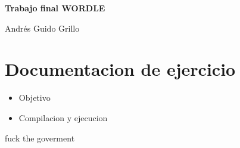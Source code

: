 \documentclass[oneside]{article}
\begin{document}
	\thispagestyle{fancy}
	\begin{titlepage}
		\vspace*{\fill}		
		\centering
		{\huge \bfseries Trabajo final WORDLE\par}
		\vspace{1cm}
		{\large Andrés Guido Grillo\par}		
		\vfill
	\end{titlepage}
	
	\section*{Documentacion de ejercicio}
	\begin{itemize}
		\item Objetivo
		\item Compilacion y ejecucion
	\end{itemize}
		
		
	\newpage
	\thispagestyle{fancy}
	fuck the goverment
\end{document}
